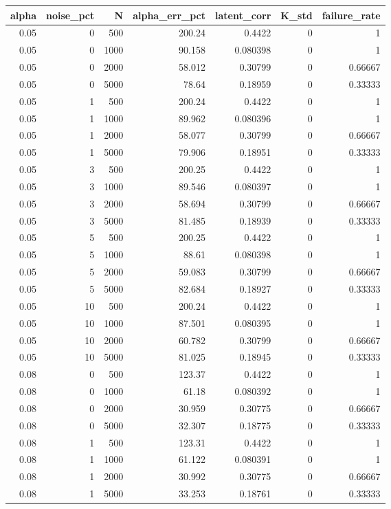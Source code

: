 \begin{tabular}{rrrrrrr}
\toprule
alpha & noise_pct & N & alpha_err_pct & latent_corr & K_std & failure_rate \\
\midrule
0.05 & 0 & 500 & 200.24 & 0.4422 & 0 & 1 \\
0.05 & 0 & 1000 & 90.158 & 0.080398 & 0 & 1 \\
0.05 & 0 & 2000 & 58.012 & 0.30799 & 0 & 0.66667 \\
0.05 & 0 & 5000 & 78.64 & 0.18959 & 0 & 0.33333 \\
0.05 & 1 & 500 & 200.24 & 0.4422 & 0 & 1 \\
0.05 & 1 & 1000 & 89.962 & 0.080396 & 0 & 1 \\
0.05 & 1 & 2000 & 58.077 & 0.30799 & 0 & 0.66667 \\
0.05 & 1 & 5000 & 79.906 & 0.18951 & 0 & 0.33333 \\
0.05 & 3 & 500 & 200.25 & 0.4422 & 0 & 1 \\
0.05 & 3 & 1000 & 89.546 & 0.080397 & 0 & 1 \\
0.05 & 3 & 2000 & 58.694 & 0.30799 & 0 & 0.66667 \\
0.05 & 3 & 5000 & 81.485 & 0.18939 & 0 & 0.33333 \\
0.05 & 5 & 500 & 200.25 & 0.4422 & 0 & 1 \\
0.05 & 5 & 1000 & 88.61 & 0.080398 & 0 & 1 \\
0.05 & 5 & 2000 & 59.083 & 0.30799 & 0 & 0.66667 \\
0.05 & 5 & 5000 & 82.684 & 0.18927 & 0 & 0.33333 \\
0.05 & 10 & 500 & 200.24 & 0.4422 & 0 & 1 \\
0.05 & 10 & 1000 & 87.501 & 0.080395 & 0 & 1 \\
0.05 & 10 & 2000 & 60.782 & 0.30799 & 0 & 0.66667 \\
0.05 & 10 & 5000 & 81.025 & 0.18945 & 0 & 0.33333 \\
0.08 & 0 & 500 & 123.37 & 0.4422 & 0 & 1 \\
0.08 & 0 & 1000 & 61.18 & 0.080392 & 0 & 1 \\
0.08 & 0 & 2000 & 30.959 & 0.30775 & 0 & 0.66667 \\
0.08 & 0 & 5000 & 32.307 & 0.18775 & 0 & 0.33333 \\
0.08 & 1 & 500 & 123.31 & 0.4422 & 0 & 1 \\
0.08 & 1 & 1000 & 61.122 & 0.080391 & 0 & 1 \\
0.08 & 1 & 2000 & 30.992 & 0.30775 & 0 & 0.66667 \\
0.08 & 1 & 5000 & 33.253 & 0.18761 & 0 & 0.33333 \\

\end{tabular}
